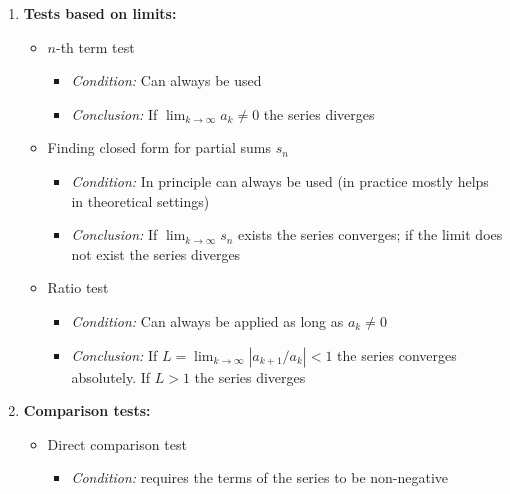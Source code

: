 \documentclass[main]{subfiles}
\begin{document}
\begin{enumerate}
\begin{enumerate}
\begin{solution}
\begin{enumerate}
\begin{itemize}
\begin{itemize}
                \item \textit{Conclusion:} If $|a_{k+1}|<|a_k|$ and $\displaystyle\lim_{k \to \infty} |a_k| = 0$ then the series converges
            \end{itemize}
        \end{itemize}

    \item \textbf{Tests based on limits:}
        \begin{itemize}
            \item $n$-th term test
            \begin{itemize}
                \item \textit{Condition:} Can always be used

                \item \textit{Conclusion:} If $\displaystyle\lim_{k\to \infty} a_k \neq 0$ the series diverges
            \end{itemize}

            \item Finding closed form for partial sums $s_n$
            \begin{itemize}
                \item \textit{Condition:} In principle can always be used (in practice mostly helps in theoretical settings)

                \item \textit{Conclusion:} If $\displaystyle \lim_{k \to \infty} s_n$ exists the series converges; if the limit does not exist the series diverges
            \end{itemize}

            \item Ratio test
            \begin{itemize}
                \item \textit{Condition:} Can always be applied as long as $a_k \neq 0$

                \item \textit{Conclusion:} If $L = \displaystyle\lim_{k \to \infty} |a_{k+1}/a_k| < 1$ the series converges absolutely. If $L>1$ the series diverges
            \end{itemize}

            
        \end{itemize}
    

    \item \textbf{Comparison tests:}
        \begin{itemize}
            \item Direct comparison test
            \begin{itemize}
                \item \textit{Condition:} requires the terms of the series to be non-negative


\end{itemize}
\end{itemize}
\end{enumerate}
\end{solution}
\end{enumerate}
\end{enumerate}
\end{document}
